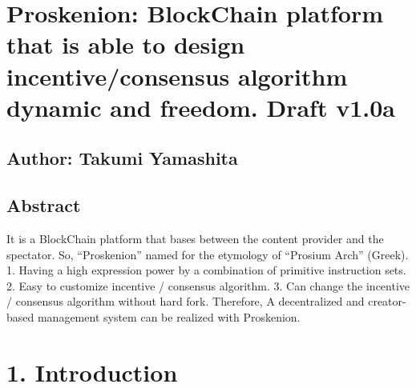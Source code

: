 \hypertarget{proskenion-blockchain-platform-that-is-able-to-design-incentiveconsensus-algorithm-dynamic-and-freedom.-draft-v1.0a}{%
\chapter{Proskenion: BlockChain platform that is able to design
incentive/consensus algorithm dynamic and freedom. Draft
v1.0a}\label{proskenion-blockchain-platform-that-is-able-to-design-incentiveconsensus-algorithm-dynamic-and-freedom.-draft-v1.0a}}

\hypertarget{author-takumi-yamashita}{%
\section{Author: Takumi Yamashita}\label{author-takumi-yamashita}}

\hypertarget{abstract}{%
\section{Abstract}\label{abstract}}

It is a BlockChain platform that bases between the content provider and
the spectator. So, ``Proskenion'' named for the etymology of ``Prosium
Arch'' (Greek). 1. Having a high expression power by a combination of
primitive instruction sets. 2. Easy to customize incentive / consensus
algorithm. 3. Can change the incentive / consensus algorithm without
hard fork. Therefore, A decentralized and creator-based management
system can be realized with Proskenion.

\hypertarget{introduction}{%
\chapter{1. Introduction}\label{introduction}}

